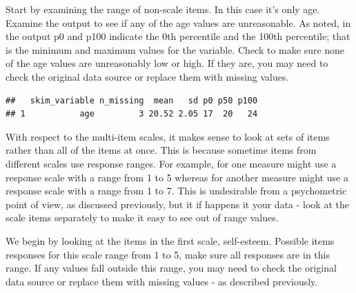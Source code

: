 \documentclass[
]{krantz}
\makeatletter
\newenvironment{Shaded}{\begin{snugshade}}{\end{snugshade}}
\newcommand{\KeywordTok}[1]{\textcolor[rgb]{0.27,0.27,0.27}{\textbf{#1}}}
\newcommand{\NormalTok}[1]{#1}
\newcommand{\OperatorTok}[1]{\textcolor[rgb]{0.43,0.43,0.43}{\textbf{#1}}}
\newcommand{\StringTok}[1]{\textcolor[rgb]{0.5,0.5,0.5}{#1}}
\newenvironment{kframe}{%
\medskip{}
\setlength{\fboxsep}{.8em}
 \def\at@end@of@kframe{}%
 \ifinner\ifhmode%
  \def\at@end@of@kframe{\end{minipage}}%
  \begin{minipage}{\columnwidth}%
 \fi\fi%
 \def\FrameCommand##1{\hskip\@totalleftmargin \hskip-\fboxsep
 \colorbox{shadecolor}{##1}\hskip-\fboxsep
     \hskip-\linewidth \hskip-\@totalleftmargin \hskip\columnwidth}%
 \MakeFramed {\advance\hsize-\width
   \@totalleftmargin\z@ \linewidth\hsize
   \@setminipage}}%
 {\par\unskip\endMakeFramed%
 \at@end@of@kframe}
\renewenvironment{Shaded}{\begin{kframe}}{\end{kframe}}
\makeatother
\begin{document}
Start by examining the range of non-scale items. In this case it's only age. Examine the output to see if any of the age values are unreasonable. As noted, in the output p0 and p100 indicate the 0th percentile and the 100th percentile; that is the minimum and maximum values for the variable. Check to make sure none of the age values are unreasonably low or high. If they are, you may need to check the original data source or replace them with missing values.

\begin{Shaded}
\end{Shaded}

\begin{verbatim}
##   skim_variable n_missing  mean   sd p0 p50 p100
## 1           age         3 20.52 2.05 17  20   24
\end{verbatim}

With respect to the multi-item scales, it makes sense to look at sets of items rather than all of the items at once. This is because sometime items from different scales use response ranges. For example, for one measure might use a response scale with a range from 1 to 5 whereas for another measure might use a response scale with a range from 1 to 7. This is undesirable from a psychometric point of view, as discussed previously, but it if happens it your data - look at the scale items separately to make it easy to see out of range values.

We begin by looking at the items in the first scale, self-esteem. Possible items responses for this scale range from 1 to 5, make sure all responses are in this range. If any values fall outside this range, you may need to check the original data source or replace them with missing values - as described previously.

\begin{Shaded}
\end{Shaded}
\end{document}
